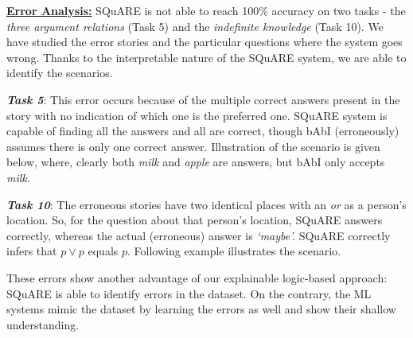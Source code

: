 \documentclass[letterpaper]{article}
\begin{document}
\smallskip
\noindent\textbf{\underline{Error Analysis:}}
SQuARE is not able to reach 100\% accuracy on two tasks  - the \textit{three argument relations} (Task 5) and the \textit{indefinite knowledge} (Task 10). We have studied the error stories and the particular questions where the system goes wrong. Thanks to the interpretable nature of the SQuARE system, we are able to identify the scenarios.

\noindent
\textit{\textbf{Task 5}}: This error occurs because of the multiple correct answers present in the story
with no indication of which one is the preferred one.
SQuARE system is capable of finding all the answers and all are correct, though bAbI (erroneously) assumes there is only one  correct answer. Illustration of the scenario is given below, where, clearly both \textit{milk} and \textit{apple} are answers, but bAbI only accepts \textit{milk}.

\smallskip
    \noindent
\cprotect {}

\medskip
\noindent\textit{\textbf{Task 10}}: The erroneous stories have two identical places with an \textit{or} as a person's location. So, for the question about that person's location, SQuARE answers correctly, whereas the actual (erroneous) answer is \textit{`maybe'.} SQuARE correctly infers that $p \vee p$ equals $p$. Following example illustrates the scenario.

    \smallskip\noindent
\cprotect {}

\smallskip
\noindent
These errors show another advantage of our  explainable logic-based approach: SQuARE is able to identify errors in the dataset. On the contrary, the ML systems mimic the dataset by learning the errors as well and show their shallow understanding.
\end{document}
